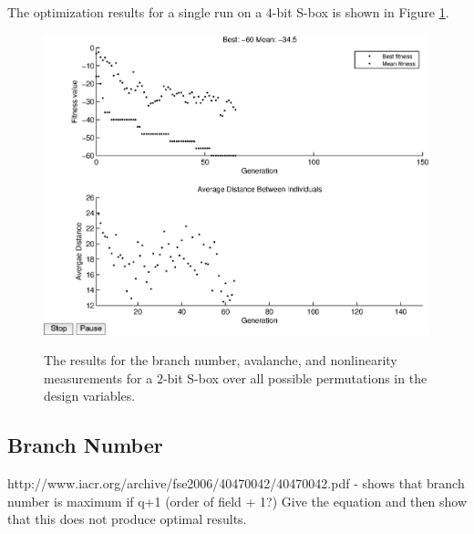 \documentclass[11pt]{article}
\begin{document}
The optimization results for a single run on a $4$-bit S-box is shown in Figure \ref{av16}.
\begin{figure}
\centering
	\includegraphics[scale=0.5]{images/avalanche_results16.eps} \\
	\label{av16}
	\caption{The results for the branch number, avalanche, and nonlinearity measurements for a $2$-bit S-box over all possible permutations in the design variables.}
\end{figure}

\subsection{Branch Number}

http://www.iacr.org/archive/fse2006/40470042/40470042.pdf - shows that branch number is maximum if q+1 (order of field + 1?) Give the equation and then show that this does not produce optimal results.
\end{document}
